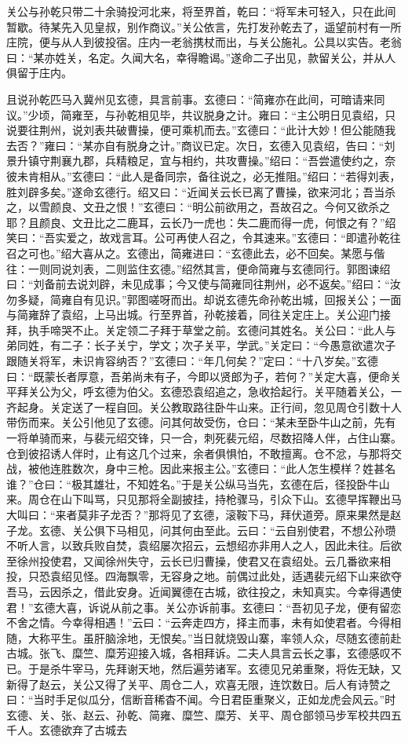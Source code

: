关公与孙乾只带二十余骑投河北来，将至界首，乾曰：“将军未可轻入，只在此间暂歇。待某先入见皇叔，别作商议。”关公依言，先打发孙乾去了，遥望前村有一所庄院，便与从人到彼投宿。庄内一老翁携杖而出，与关公施礼。公具以实告。老翁曰：“某亦姓关，名定。久闻大名，幸得瞻谒。”遂命二子出见，款留关公，并从人俱留于庄内。

且说孙乾匹马入冀州见玄德，具言前事。玄德曰：“简雍亦在此间，可暗请来同议。”少顷，简雍至，与孙乾相见毕，共议脱身之计。雍曰：“主公明日见袁绍，只说要往荆州，说刘表共破曹操，便可乘机而去。”玄德曰：“此计大妙！但公能随我去否？”雍曰：“某亦自有脱身之计。”商议已定。次日，玄德入见袁绍，告曰：“刘景升镇守荆襄九郡，兵精粮足，宜与相约，共攻曹操。”绍曰：“吾尝遣使约之，奈彼未肯相从。”玄德曰：“此人是备同宗，备往说之，必无推阻。”绍曰：“若得刘表，胜刘辟多矣。”遂命玄德行。绍又曰：“近闻关云长已离了曹操，欲来河北；吾当杀之，以雪颜良、文丑之恨！”玄德曰：“明公前欲用之，吾故召之。今何又欲杀之耶？且颜良、文丑比之二鹿耳，云长乃一虎也：失二鹿而得一虎，何恨之有？”绍笑曰：“吾实爱之，故戏言耳。公可再使人召之，令其速来。”玄德曰：“即遣孙乾往召之可也。”绍大喜从之。玄德出，简雍进曰：“玄德此去，必不回矣。某愿与偕往：一则同说刘表，二则监住玄德。”绍然其言，便命简雍与玄德同行。郭图谏绍曰：“刘备前去说刘辟，未见成事；今又使与简雍同往荆州，必不返矣。”绍曰：“汝勿多疑，简雍自有见识。”郭图嗟呀而出。却说玄德先命孙乾出城，回报关公；一面与简雍辞了袁绍，上马出城。行至界首，孙乾接着，同往关定庄上。关公迎门接拜，执手啼哭不止。关定领二子拜于草堂之前。玄德问其姓名。关公曰：“此人与弟同姓，有二子：长子关宁，学文；次子关平，学武。”关定曰：“今愚意欲遣次子跟随关将军，未识肯容纳否？”玄德曰：“年几何矣？”定曰：“十八岁矣。”玄德曰：“既蒙长者厚意，吾弟尚未有子，今即以贤郎为子，若何？”关定大喜，便命关平拜关公为父，呼玄德为伯父。玄德恐袁绍追之，急收拾起行。关平随着关公，一齐起身。关定送了一程自回。关公教取路往卧牛山来。正行间，忽见周仓引数十人带伤而来。关公引他见了玄德。问其何故受伤，仓曰：“某未至卧牛山之前，先有一将单骑而来，与裴元绍交锋，只一合，刺死裴元绍，尽数招降人伴，占住山寨。仓到彼招诱人伴时，止有这几个过来，余者俱惧怕，不敢擅离。仓不忿，与那将交战，被他连胜数次，身中三枪。因此来报主公。”玄德曰：“此人怎生模样？姓甚名谁？”仓曰：“极其雄壮，不知姓名。”于是关公纵马当先，玄德在后，径投卧牛山来。周仓在山下叫骂，只见那将全副披挂，持枪骤马，引众下山。玄德早挥鞭出马大叫曰：“来者莫非子龙否？”那将见了玄德，滚鞍下马，拜伏道旁。原来果然是赵子龙。玄德、关公俱下马相见，问其何由至此。云曰：“云自别使君，不想公孙瓒不听人言，以致兵败自焚，袁绍屡次招云，云想绍亦非用人之人，因此未往。后欲至徐州投使君，又闻徐州失守，云长已归曹操，使君又在袁绍处。云几番欲来相投，只恐袁绍见怪。四海飘零，无容身之地。前偶过此处，适遇裴元绍下山来欲夺吾马，云因杀之，借此安身。近闻翼德在古城，欲往投之，未知真实。今幸得遇使君！”玄德大喜，诉说从前之事。关公亦诉前事。玄德曰：“吾初见子龙，便有留恋不舍之情。今幸得相遇！”云曰：“云奔走四方，择主而事，未有如使君者。今得相随，大称平生。虽肝脑涂地，无恨矣。”当日就烧毁山寨，率领人众，尽随玄德前赴古城。张飞、糜竺、糜芳迎接入城，各相拜诉。二夫人具言云长之事，玄德感叹不已。于是杀牛宰马，先拜谢天地，然后遍劳诸军。玄德见兄弟重聚，将佐无缺，又新得了赵云，关公又得了关平、周仓二人，欢喜无限，连饮数日。后人有诗赞之曰：“当时手足似瓜分，信断音稀杳不闻。今日君臣重聚义，正如龙虎会风云。”时玄德、关、张、赵云、孙乾、简雍、糜竺、糜芳、关平、周仓部领马步军校共四五千人。玄德欲弃了古城去